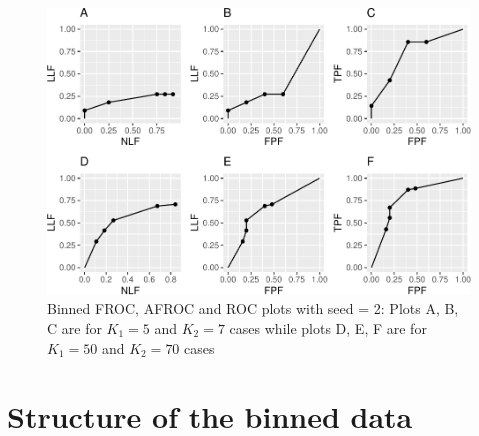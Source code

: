 \documentclass[
]{book}
\newenvironment{Shaded}{\begin{snugshade}}{\end{snugshade}}
\newcommand{\CommentTok}[1]{\textcolor[rgb]{0.56,0.35,0.01}{\textit{#1}}}
\newcommand{\FunctionTok}[1]{\textcolor[rgb]{0.00,0.00,0.00}{#1}}
\newcommand{\NormalTok}[1]{#1}
\newcommand{\SpecialCharTok}[1]{\textcolor[rgb]{0.00,0.00,0.00}{#1}}
\begin{document}
\begin{figure}
\centering
\includegraphics{13b-froc-empirical2_files/figure-latex/froc-afroc-roc-binned-seed2-1.pdf}
\caption{\label{fig:froc-afroc-roc-binned-seed2}Binned FROC, AFROC and ROC plots with seed = 2: Plots A, B, C are for \(K_1 = 5\) and \(K_2 = 7\) cases while plots D, E, F are for \(K_1 = 50\) and \(K_2 = 70\) cases}
\end{figure}

\hypertarget{froc-empirical-examples-str-binned-data}{%
\section{Structure of the binned data}\label{froc-empirical-examples-str-binned-data}}

\begin{Shaded}
\end{Shaded}
\end{document}
